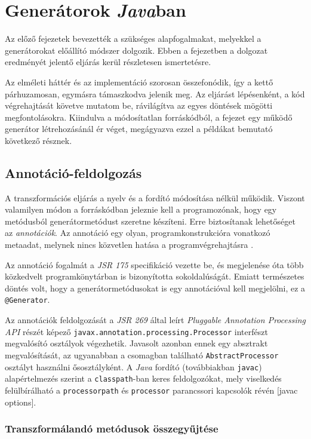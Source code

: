 \chapter{Generátorok \textit{Java}ban}

Az előző fejezetek bevezették a szükséges alapfogalmakat, melyekkel a generátorokat előállító módszer dolgozik. Ebben a fejezetben a dolgozat eredményét jelentő eljárás kerül részletesen ismertetésre.

Az elméleti háttér és az implementáció szorosan összefonódik, így a kettő párhuzamosan, egymásra támaszkodva jelenik meg. Az eljárást lépésenként, a kód végrehajtását követve mutatom be, rávilágítva az egyes döntések mögötti megfontolásokra. Kiindulva a módosítatlan forráskódból, a fejezet egy működő generátor létrehozásánál ér véget, megágyazva ezzel a példákat bemutató következő résznek.

\section{Annotáció-feldolgozás}

A transzformációs eljárás a nyelv és a fordító módosítása nélkül működik. Viszont valamilyen módon a forráskódban jeleznie kell a programozónak, hogy egy metódusból generátormetódust szeretne készíteni. Erre biztosítanak lehetőséget az \textit{annotációk}. Az annotáció egy olyan, programkonstrukcióra vonatkozó metaadat, melynek nincs közvetlen hatása a programvégrehajtásra \cite{JLS8}.

Az annotáció fogalmát a \textit{JSR 175} specifikáció vezette be, és megjelenése óta több közkedvelt programkönytárban is bizonyította sokoldalúságát. Emiatt természetes döntés volt, hogy a generátormetódusokat is egy annotációval kell megjelölni, ez a \texttt{@Generator}.

Az annotációk feldolgozását a \textit{JSR 269} által leírt \textit{Pluggable Annotation Processing API} részét képező \texttt{javax.annotation.processing.Processor} interfészt megvalósító osztályok végezhetik. Javasolt azonban ennek egy absztrakt megvalósítását, az ugyanabban a csomagban található \texttt{AbstractProcessor} osztályt használni ősosztályként. A \textit{Java} fordító (továbbiakban \texttt{javac}) alapértelmezés szerint a \texttt{classpath}-ban keres feldolgozókat, mely viselkedés felülbírálható a \texttt{processorpath} és \texttt{processor} parancssori kapcsolók révén [javac options].

\subsection{Transzformálandó metódusok összegyűjtése}

